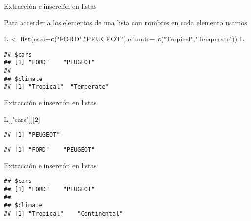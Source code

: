 \documentclass[ignorenonframetext,]{beamer}
\newenvironment{Shaded}{\begin{snugshade}}{\end{snugshade}}
\newcommand{\KeywordTok}[1]{\textcolor[rgb]{0.13,0.29,0.53}{\textbf{#1}}}
\newcommand{\DataTypeTok}[1]{\textcolor[rgb]{0.13,0.29,0.53}{#1}}
\newcommand{\DecValTok}[1]{\textcolor[rgb]{0.00,0.00,0.81}{#1}}
\newcommand{\StringTok}[1]{\textcolor[rgb]{0.31,0.60,0.02}{#1}}
\newcommand{\OperatorTok}[1]{\textcolor[rgb]{0.81,0.36,0.00}{\textbf{#1}}}
\newcommand{\NormalTok}[1]{#1}
\begin{document}
\begin{frame}[fragile]{Extracción e inserción en listas}

Para accerder a los elementos de una lista con nombres en cada elemento
usamos

\begin{Shaded}
\begin{Highlighting}[]
\NormalTok{L <-}\StringTok{ }\KeywordTok{list}\NormalTok{(}\DataTypeTok{cars=}\KeywordTok{c}\NormalTok{(}\StringTok{"FORD"}\NormalTok{,}\StringTok{"PEUGEOT"}\NormalTok{),}\DataTypeTok{climate=}
            \KeywordTok{c}\NormalTok{(}\StringTok{"Tropical"}\NormalTok{,}\StringTok{"Temperate"}\NormalTok{))}
\NormalTok{L}
\end{Highlighting}
\end{Shaded}
\pause
\begin{verbatim}
## $cars
## [1] "FORD"    "PEUGEOT"
## 
## $climate
## [1] "Tropical"  "Temperate"
\end{verbatim}

\end{frame}

\begin{frame}[fragile]{Extracción e inserción en listas}

\begin{Shaded}
\begin{Highlighting}[]
\NormalTok{L[[}\StringTok{"cars"}\NormalTok{]][}\DecValTok{2}\NormalTok{]}
\end{Highlighting}
\end{Shaded}
\pause
\begin{verbatim}
## [1] "PEUGEOT"
\end{verbatim}

\begin{Shaded}
\end{Shaded}
\pause
\begin{verbatim}
## [1] "FORD"    "PEUGEOT"
\end{verbatim}

\end{frame}

\begin{frame}[fragile]{Extracción e inserción en listas}

\begin{Shaded}
\end{Shaded}
\pause
\begin{verbatim}
## $cars
## [1] "FORD"    "PEUGEOT"
## 
## $climate
## [1] "Tropical"    "Continental"
\end{verbatim}

\end{frame}
\end{document}
